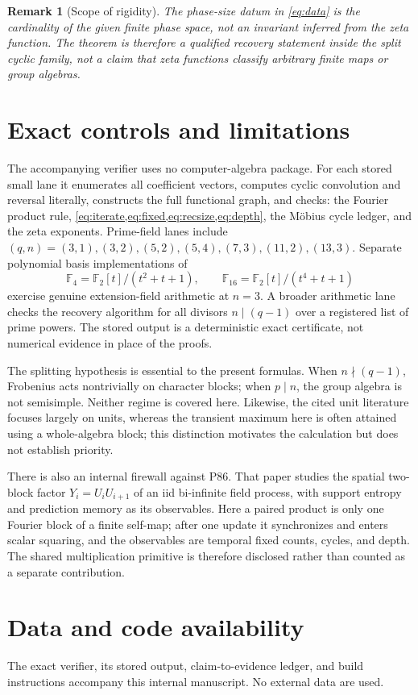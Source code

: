 \documentclass[11pt,a4paper]{amsart}
\newcommand{\F}{\mathbb F}
\newtheorem{remark}[theorem]{Remark}
\begin{document}
\begin{remark}[Scope of rigidity]
The phase-size datum in \eqref{eq:data} is the cardinality of the given
finite phase space, not an invariant inferred from the zeta function.  The
theorem is therefore a qualified recovery statement inside the split cyclic
family, not a claim that zeta functions classify arbitrary finite maps or
group algebras.
\end{remark}

\section{Exact controls and limitations}

The accompanying verifier uses no computer-algebra package.  For each stored
small lane it enumerates all coefficient vectors, computes cyclic convolution
and reversal literally, constructs the full functional graph, and checks:
the Fourier product rule, \cref{eq:iterate,eq:fixed,eq:recsize,eq:depth}, the
M\"obius cycle ledger, and the zeta exponents.  Prime-field lanes include
$(q,n)=(3,1),(3,2),(5,2),(5,4),(7,3),(11,2),(13,3)$.  Separate polynomial
basis implementations of
\[
 \F_4=\F_2[t]/(t^2+t+1),\qquad
 \F_{16}=\F_2[t]/(t^4+t+1)
\]
exercise genuine extension-field arithmetic at $n=3$.  A broader arithmetic
lane checks the recovery algorithm for all divisors $n\mid(q-1)$ over a
registered list of prime powers.  The stored output is a deterministic exact
certificate, not numerical evidence in place of the proofs.

The splitting hypothesis is essential to the present formulas.  When
$n\nmid(q-1)$, Frobenius acts nontrivially on character blocks; when
$p\mid n$, the group algebra is not semisimple.  Neither regime is covered
here.  Likewise, the cited unit literature focuses largely on units, whereas
the transient maximum here is often attained using a whole-algebra block;
this distinction motivates the calculation but does not establish priority.

There is also an internal firewall against P86.  That paper studies the
spatial two-block factor $Y_i=U_iU_{i+1}$ of an iid bi-infinite field process,
with support entropy and prediction memory as its observables.  Here a paired
product is only one Fourier block of a finite self-map; after one update it
synchronizes and enters scalar squaring, and the observables are temporal
fixed counts, cycles, and depth.  The shared multiplication primitive is
therefore disclosed rather than counted as a separate contribution.

\section*{Data and code availability}

The exact verifier, its stored output, claim-to-evidence ledger, and build
instructions accompany this internal manuscript.  No external data are used.



\end{document}
